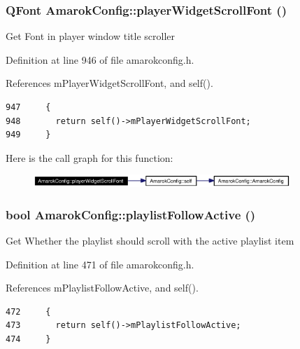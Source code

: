 \subsubsection{\setlength{\rightskip}{0pt plus 5cm}QFont Amarok\-Config::player\-Widget\-Scroll\-Font ()\hspace{0.3cm}{\tt  [inline, static]}}\label{classAmarokConfig_AmarokConfige98}


Get Font in player window title scroller 

Definition at line 946 of file amarokconfig.h.

References m\-Player\-Widget\-Scroll\-Font, and self().



\footnotesize\begin{verbatim}947     {
948       return self()->mPlayerWidgetScrollFont;
949     }
\end{verbatim}\normalsize 


Here is the call graph for this function:\begin{figure}[H]
\begin{center}
\leavevmode
\includegraphics[width=275pt]{classAmarokConfig_AmarokConfige98_cgraph}
\end{center}
\end{figure}
\subsubsection{\setlength{\rightskip}{0pt plus 5cm}bool Amarok\-Config::playlist\-Follow\-Active ()\hspace{0.3cm}{\tt  [inline, static]}}\label{classAmarokConfig_AmarokConfige48}


Get Whether the playlist should scroll with the active playlist item 

Definition at line 471 of file amarokconfig.h.

References m\-Playlist\-Follow\-Active, and self().



\footnotesize\begin{verbatim}472     {
473       return self()->mPlaylistFollowActive;
474     }
\end{verbatim}\normalsize 


